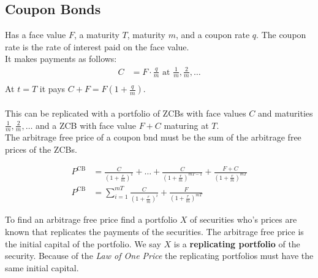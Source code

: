 \documentclass[12pt,letterpaper, twocolumn]{article}
\begin{document}
\subsection{Coupon Bonds}
Has a face value $F$, a maturity $T$, maturity $m$, and a coupon rate $q$. The coupon rate is the rate of interest paid on the face value.
\\It makes payments as follows:
\begin{align*}
    C&= F \cdot \frac{q}{m} \text{ at } \frac{1}{m}, \frac{2}{m}, \dots\\
\end{align*}
At $t=T$ it pays $C+F = F(1+\frac{q}{m})$.
\\\\
This can be replicated with a portfolio of ZCBs with face values $C$ and maturities $\frac{1}{m}, \frac{2}{m}, \dots$ and a ZCB with face value $F+C$ maturing at $T$. \\

The arbitrage free price of a coupon bnd must be the sum of the arbitrage free prices of the ZCBs. 

\begin{align*}
    P^{\text{CB}} &= \frac{C}{(1+\frac{r}{m})^1} + \dots + \frac{C}{(1+\frac{r}{m})^{mT-1}} + \frac{F+C}{(1+\frac{r}{m})^{mT}}\\
    P^{\text{CB}} &= \sum_{i=1}^{mT}\frac{C}{(1+\frac{r}{m})^i} + \frac{F}{(1+\frac{r}{m})^{mT}}
\end{align*}

To find an arbitrage free price find a portfolio $X$ of securities who's prices are known that replicates the payments of the securities. The arbitrage free price is the initial capital of the portfolio. We say $X$ is a \textbf{replicating portfolio} of the security. Because of the \textit{Law of One Price} the replicating portfolios must have the same initial capital. 
\end{document}
